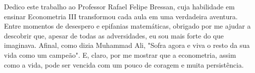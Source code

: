 \begin{dedicatoria}
   \vspace*{\fill}

{%
	\noindent\hspace{.5\textwidth}
	{\begin{minipage}{.5\textwidth}
			\begin{flushleft}
				Dedico este trabalho ao Professor Rafael Felipe Bressan, cuja habilidade em ensinar Econometria III transformou cada aula em uma verdadeira aventura. Entre momentos de desespero e epifanias matemáticas, obrigado por me ajudar a descobrir que, apesar de todas as adversidades, eu sou mais forte do que imaginava. Afinal, como dizia Muhammad Ali, "Sofra agora e viva o resto da sua vida como um campeão". E, claro, por me mostrar que a econometria, assim como a vida, pode ser vencida com um pouco de coragem e muita persistência.
			\end{flushleft}
	\end{minipage}}%
\vspace*{3cm}
}%

\end{dedicatoria}
